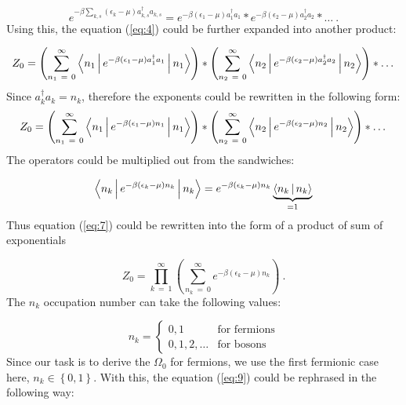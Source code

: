 \begin{equation} \label{eq:5}
e^{-\beta \sum_{k,s} \left( \epsilon_{k} - \mu \right) a_{k,s}^{\dagger} a_{k,s}}
=
e^{-\beta \left( \epsilon_{1} - \mu \right) a_{1}^{\dagger} a_{1}}
*
e^{-\beta \left( \epsilon_{2} - \mu \right) a_{2}^{\dagger} a_{2}}
*
\dots
\ .
\end{equation}
Using this, the equation (\ref{eq:4}) could be further expanded into another product:

\begin{equation} \label{eq:6}
Z_{0}
=
\left( \sum_{n_{1}\ =\ 0}^{\infty} \Braket{n_{1}|e^{-\beta \left( \epsilon_{1} - \mu \right) a_{1}^{\dagger} a_{1}}|n_{1}} \right)
*
\left( \sum_{n_{2}\ =\ 0}^{\infty} \Braket{n_{2}|e^{-\beta \left( \epsilon_{2} - \mu \right) a_{2}^{\dagger} a_{2}}|n_{2}} \right)
*
\dots
\end{equation}
Since $a^{\dagger}_{k} a_{k} = n_{k}$, therefore the exponents could be rewritten in the following form:
\begin{equation} \label{eq:7}
Z_{0}
=
\left( \sum_{n_{1}\ =\ 0}^{\infty} \Braket{n_{1}|e^{-\beta \left( \epsilon_{1} - \mu \right) n_{1}}|n_{1}} \right)
*
\left( \sum_{n_{2}\ =\ 0}^{\infty} \Braket{n_{2}|e^{-\beta \left( \epsilon_{2} - \mu \right) n_{2}}|n_{2}} \right)
*
\dots
\end{equation}
The operators could be multiplied out from the sandwiches:

\begin{equation} \label{eq:8}
\Braket{n_{k}|e^{-\beta \left( \epsilon_{k} - \mu \right) n_{k}}|n_{k}}
=
e^{-\beta \left( \epsilon_{k} - \mu \right) n_{k}} \underbrace{\Braket{n_{k}|n_{k}}}_{=1}
\end{equation}
Thus equation (\ref{eq:7}) could be rewritten into the form of a product of sum of exponentials

\begin{equation} \label{eq:9}
Z_{0}
=
\prod_{k\ =\ 1}^{\infty}
\left(
\sum_{n_{k}\ =\ 0}^{\infty} e^{-\beta \left( \epsilon_{k} - \mu \right) n_{k}}
\right)
\ .
\end{equation}
The $n_{k}$ occupation number can take the following values:

\begin{equation*}
n_{k}
=
\begin{cases}
0,1 & \text{for fermions} \\
0,1,2,\dots & \text{for bosons}
\end{cases}
\end{equation*}
Since our task is to derive the $\Omega_{0}$ for fermions, we use the first fermionic case here, $n_{k} \in \left\{ 0,1 \right\}$. With this, the equation (\ref{eq:9}) could be rephrased in the following way:

